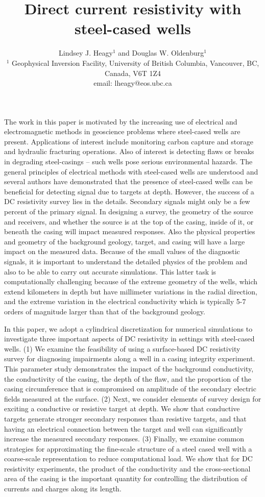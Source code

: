 \documentclass[extra,mreferee]{gji}
\title{
  Direct current resistivity with steel-cased wells
}
\author[Lindsey J. Heagy, Douglas W. Oldenburg]{
  Lindsey J. Heagy$^1$ and Douglas W. Oldenburg$^1$\\
  $^1$ Geophysical Inversion Facility, University of British Columbia, Vancouver, BC, Canada, V6T 1Z4
  \\ \quad email: lheagy@eos.ubc.ca
}
\begin{document}
\label{firstpage}

\maketitle

\begin{summary}

The work in this paper is motivated by the increasing use of electrical and electromagnetic methods in geoscience problems where steel-cased wells are present. Applications of interest include monitoring carbon capture and storage and hydraulic fracturing operations. Also of interest is detecting flaws or breaks in degrading steel-casings -- such wells pose serious environmental hazards. The general principles of electrical methods with steel-cased wells are understood and several authors have demonstrated that the presence of steel-cased wells can be beneficial for detecting signal due to targets at depth. However, the success of a DC resistivity survey lies in the details. Secondary signals might only be a few percent of the primary signal. In designing a survey, the geometry of the source and receivers, and whether the source is at the top of the casing, inside of it, or beneath the casing will impact measured responses. Also  the physical properties and geometry of the background geology, target, and casing will have a large impact on the measured data. Because of the small values of the diagnostic signals, it is important to understand the detailed physics of the problem and also to be able to carry out accurate simulations. This latter task is computationally challenging because of the extreme geometry of the wells, which extend kilometers in depth but have millimeter variations in the radial direction, and the extreme variation in the electrical conductivity which is typically 5-7 orders of magnitude larger than that of the  background geology.

In this paper, we adopt a cylindrical discretization for numerical simulations to investigate three important aspects of DC resistivity in settings with steel-cased wells. (1) We examine the feasibility of using a surface-based DC resistivity survey for diagnosing impairments along a well in a casing integrity experiment. This parameter study demonstrates the impact of the background conductivity, the conductivity of the casing, the depth of the flaw, and the proportion of the casing circumference that is compromised on amplitude of the secondary electric fields measured at the surface. (2) Next, we consider elements of survey design for exciting a conductive or resistive target at depth. We show that conductive targets generate stronger secondary responses than resistive targets, and that having an electrical connection between the target and well can significantly increase the measured secondary responses. (3) Finally, we examine common strategies for approximating the fine-scale structure of a steel cased well with a coarse-scale representation to reduce computational load. We show that for DC resistivity experiments, the product of the conductivity and the cross-sectional area of the casing is the important quantity for controlling the distribution of currents and charges along its length.


\end{summary}
\end{document}
